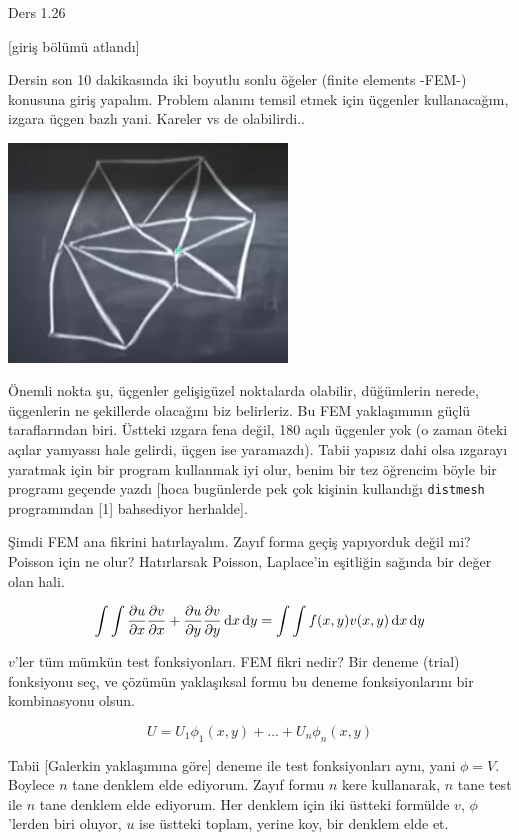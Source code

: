 \documentclass[12pt,fleqn]{article}\usepackage{../../common}
\begin{document}
Ders 1.26

[giriş bölümü atlandı]

Dersin son 10 dakikasında iki boyutlu sonlu öğeler (finite elements -FEM-)
konusuna giriş yapalım. Problem alanını temsil etmek için üçgenler kullanacağım,
izgara üçgen bazlı yani. Kareler vs de olabilirdi..

\includegraphics[width=20em]{compscieng_1_26_01.png}

Önemli nokta şu, üçgenler gelişigüzel noktalarda olabilir, düğümlerin nerede,
üçgenlerin ne şekillerde olacağını biz belirleriz. Bu FEM yaklaşımının güçlü
taraflarından biri. Üstteki ızgara fena değil, 180 açılı üçgenler yok (o zaman
öteki açılar yamyassı hale gelirdi, üçgen ise yaramazdı). Tabii yapısız dahi
olsa ızgarayı yaratmak için bir program kullanmak iyi olur, benim bir
tez öğrencim böyle bir programı geçende yazdı [hoca bugünlerde pek çok kişinin
kullandığı \verb!distmesh! programından [1] bahsediyor herhalde]. 

Şimdi FEM ana fikrini hatırlayalım. Zayıf forma geçiş yapıyorduk değil mi?
Poisson için ne olur? Hatırlarsak Poisson, Laplace'in eşitliğin sağında bir
değer olan hali.

$$
\int \int
\frac{\partial u}{\partial x} \frac{\partial v}{\partial x} +
\frac{\partial u}{\partial y} \frac{\partial v}{\partial y}
\,\mathrm{d} x \,\mathrm{d} y =
\int \int f(x,y) v(x,y) \,\mathrm{d} x \,\mathrm{d} y 
$$

$v$'ler tüm mümkün test fonksiyonları. FEM fikri nedir? Bir deneme (trial)
fonksiyonu seç, ve çözümün yaklaşıksal formu bu deneme fonksiyonlarını bir
kombinasyonu olsun.

$$
U = U_1 \phi_1(x,y) + ... + U_n \phi_n(x,y) 
$$

Tabii [Galerkin yaklaşımına göre] deneme ile test fonksiyonları aynı, yani
$\phi = V$. Boylece $n$ tane denklem elde ediyorum. Zayıf formu $n$ kere kullanarak,
$n$ tane test ile $n$ tane denklem elde ediyorum. Her denklem için iki üstteki
formülde $v$, $\phi$'lerden biri oluyor, $u$ ise üstteki toplam, yerine koy,
bir denklem elde et.
\end{document}
